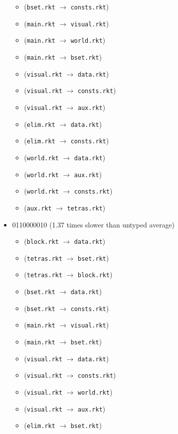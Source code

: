 \documentclass{article}
\newcommand{\mono}[1]{\texttt{#1}}
\begin{document}
\begin{itemize}
\begin{itemize}
  \item (\mono{bset.rkt} $\rightarrow$ \mono{consts.rkt})
  \item (\mono{main.rkt} $\rightarrow$ \mono{visual.rkt})
  \item (\mono{main.rkt} $\rightarrow$ \mono{world.rkt})
  \item (\mono{main.rkt} $\rightarrow$ \mono{bset.rkt})
  \item (\mono{visual.rkt} $\rightarrow$ \mono{data.rkt})
  \item (\mono{visual.rkt} $\rightarrow$ \mono{consts.rkt})
  \item (\mono{visual.rkt} $\rightarrow$ \mono{aux.rkt})
  \item (\mono{elim.rkt} $\rightarrow$ \mono{data.rkt})
  \item (\mono{elim.rkt} $\rightarrow$ \mono{consts.rkt})
  \item (\mono{world.rkt} $\rightarrow$ \mono{data.rkt})
  \item (\mono{world.rkt} $\rightarrow$ \mono{aux.rkt})
  \item (\mono{world.rkt} $\rightarrow$ \mono{consts.rkt})
  \item (\mono{aux.rkt} $\rightarrow$ \mono{tetras.rkt})
  \end{itemize}
\item 0110000010 (1.37 times slower than untyped average)
  \begin{itemize}
  \item (\mono{block.rkt} $\rightarrow$ \mono{data.rkt})
  \item (\mono{tetras.rkt} $\rightarrow$ \mono{bset.rkt})
  \item (\mono{tetras.rkt} $\rightarrow$ \mono{block.rkt})
  \item (\mono{bset.rkt} $\rightarrow$ \mono{data.rkt})
  \item (\mono{bset.rkt} $\rightarrow$ \mono{consts.rkt})
  \item (\mono{main.rkt} $\rightarrow$ \mono{visual.rkt})
  \item (\mono{main.rkt} $\rightarrow$ \mono{bset.rkt})
  \item (\mono{visual.rkt} $\rightarrow$ \mono{data.rkt})
  \item (\mono{visual.rkt} $\rightarrow$ \mono{consts.rkt})
  \item (\mono{visual.rkt} $\rightarrow$ \mono{world.rkt})
  \item (\mono{visual.rkt} $\rightarrow$ \mono{aux.rkt})
  \item (\mono{elim.rkt} $\rightarrow$ \mono{bset.rkt})

\end{itemize}
\end{itemize}
\end{document}
